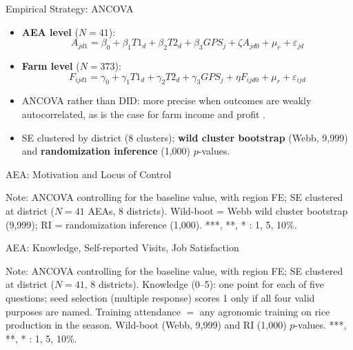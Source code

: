 \documentclass[aspectratio=169]{beamer}
\newcommand{\notefont}{\fontsize{5pt}{6pt}\selectfont}
\begin{document}
\begin{frame}{Empirical Strategy: ANCOVA}
	\begin{itemize}\small
		\item \textbf{AEA level} ($N=41$):
		\[ A_{jd1} = \beta_0 + \beta_1 T1_d + \beta_2 T2_d + \beta_3 GPS_j + \zeta A_{jd0} + \mu_r + \varepsilon_{jd} \]
		\item \textbf{Farm level} ($N=373$):
		\[ F_{ijd1} = \gamma_0 + \gamma_1 T1_d + \gamma_2 T2_d + \gamma_3 GPS_j + \eta F_{ijd0} + \mu_r + \varepsilon_{ijd} \]
		\item ANCOVA rather than DID: more precise when outcomes are weakly autocorrelated, as is the case for farm income and profit \citep{mckenzie_beyond_2012}.
		\item SE clustered by district (8 clusters); \textbf{wild cluster bootstrap} (Webb, 9{,}999) and \textbf{randomization inference} (1{,}000) $p$-values.
	\end{itemize}
\end{frame}

\begin{frame}{AEA: Motivation and Locus of Control}
	\centering
	\begin{minipage}{0.94\textwidth}
		\notefont
		Note: ANCOVA controlling for the baseline value, with region FE; SE clustered at district ($N=41$ AEAs, 8 districts).
		Wild-boot = Webb wild cluster bootstrap (9{,}999); RI = randomization inference (1{,}000).
		***, **, * : 1, 5, 10\%.
	\end{minipage}
\end{frame}

\begin{frame}{AEA: Knowledge, Self-reported Visits, Job Satisfaction}
	\centering
	\begin{minipage}{0.94\textwidth}
		\notefont
		Note: ANCOVA controlling for the baseline value, with region FE; SE clustered at district ($N=41$, 8 districts). 
        Knowledge (0--5): one point for each of five questions; seed selection (multiple response) scores 1 only if all four valid purposes are named. 
        Training attendance $=$ any agronomic training on rice production in the season.
		Wild-boot (Webb, 9{,}999) and RI (1{,}000) $p$-values. ***, **, * : 1, 5, 10\%.
	\end{minipage}
\end{frame}
\end{document}
